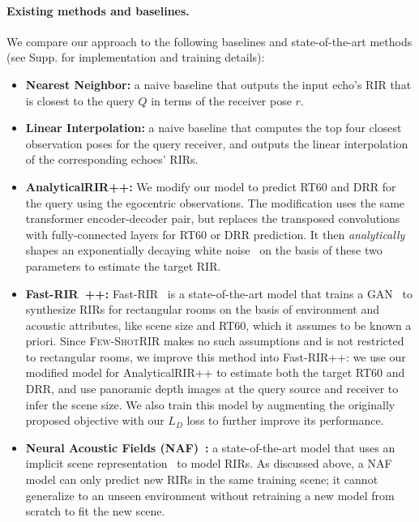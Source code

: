 \paragraph{Existing methods and baselines.} We compare our approach to the following baselines and state-of-the-art methods (see Supp. for implementation and training details):

\begin{itemize}[leftmargin=*,topsep=0pt,partopsep=0pt,itemsep=0pt,parsep=0pt]
    \item \textbf{Nearest Neighbor:} a naive baseline that outputs the input echo's RIR that is closest to the query $Q$ in terms of the receiver pose $r$. 

    \item \textbf{Linear Interpolation:} a naive baseline that computes the top four closest observation poses for the query receiver, and outputs the linear interpolation of the corresponding echoes' RIRs. 

    \item \textbf{AnalyticalRIR++:}  
    We modify our model to predict RT60 and DRR for the query using the egocentric  observations. The modification uses the same transformer encoder-decoder pair, but replaces the transposed convolutions with fully-connected layers for RT60 or DRR prediction. It then \emph{analytically} shapes an exponentially decaying white noise~\citep{rir_from_white_noise} on the basis of these two parameters to estimate the target RIR.

    \item \textbf{Fast-RIR~\citep{ratnarajah2022fast}++:} Fast-RIR~\citep{ratnarajah2022fast} is a state-of-the-art model that trains a GAN~\citep{NIPS2014_5ca3e9b1} to synthesize RIRs for rectangular rooms on the basis of environment and acoustic attributes, like scene size and RT60, which it assumes to be known a priori. Since \textsc{Few-ShotRIR}  makes no such assumptions and is not restricted to rectangular rooms, we improve this method into Fast-RIR++: we use our modified model for AnalyticalRIR++ to estimate both the target RT60 and DRR, and use panoramic depth images at the query source and receiver to infer the scene size. We also train this model by augmenting the originally proposed objective with our $L_D$ loss to further improve its performance.

    \item \textbf{Neural Acoustic Fields (NAF)~\citep{luo2022learning}:} a state-of-the-art model that uses an implicit scene representation~\citep{mildenhall2020nerf} to model RIRs. As discussed above, a NAF model can only predict new RIRs in the same training scene; it cannot generalize to an unseen environment without retraining a new model from scratch to fit the new scene.

\end{itemize}

